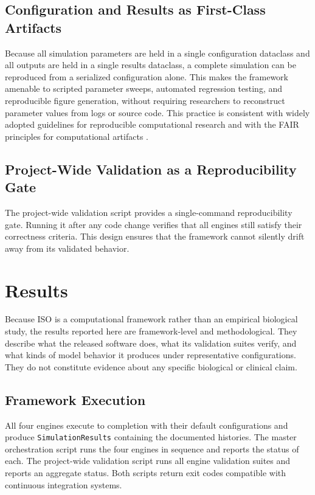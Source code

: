 \documentclass[12pt,a4paper]{article}
\begin{document}
\subsection{Configuration and Results as First-Class Artifacts}

Because all simulation parameters are held in a single configuration dataclass and all outputs are held in a single results dataclass, a complete simulation can be reproduced from a serialized configuration alone. This makes the framework amenable to scripted parameter sweeps, automated regression testing, and reproducible figure generation, without requiring researchers to reconstruct parameter values from logs or source code. This practice is consistent with widely adopted guidelines for reproducible computational research \citep{sandve2013} and with the FAIR principles for computational artifacts \citep{wilkinson2016}.

\subsection{Project-Wide Validation as a Reproducibility Gate}

The project-wide validation script provides a single-command reproducibility gate. Running it after any code change verifies that all engines still satisfy their correctness criteria. This design ensures that the framework cannot silently drift away from its validated behavior.

\section{Results}
\label{sec:results}

Because ISO is a computational framework rather than an empirical biological study, the results reported here are framework-level and methodological. They describe what the released software does, what its validation suites verify, and what kinds of model behavior it produces under representative configurations. They do not constitute evidence about any specific biological or clinical claim.

\subsection{Framework Execution}

All four engines execute to completion with their default configurations and produce \texttt{SimulationResults} containing the documented histories. The master orchestration script runs the four engines in sequence and reports the status of each. The project-wide validation script runs all engine validation suites and reports an aggregate status. Both scripts return exit codes compatible with continuous integration systems.
\end{document}
